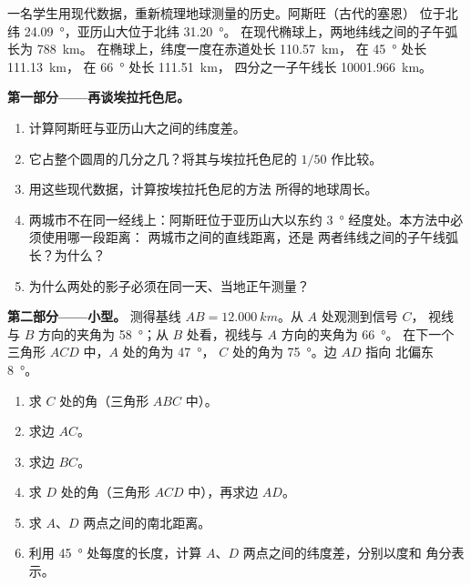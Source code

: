 \begin{problem}
\label{pb:g10:measuring-the-earth:1}
一名学生用现代数据，重新梳理地球测量的历史。阿斯旺（古代的塞恩）
位于北纬 \qty{24.09}{\degree}，亚历山大位于北纬 \qty{31.20}{\degree}。
在现代椭球上，两地纬线之间的子午弧长为 \qty{788}{km}。
在椭球上，纬度一度在赤道处长 \qty{110.57}{km}，
在 \qty{45}{\degree} 处长 \qty{111.13}{km}，
在 \qty{66}{\degree} 处长 \qty{111.51}{km}，
四分之一子午线长
\qty{10001.966}{km}。

\medskip
\noindent\textbf{第一部分——再谈埃拉托色尼。}
\begin{enumerate}
  \item 计算阿斯旺与亚历山大之间的纬度差。
  \item 它占整个圆周的几分之几？将其与埃拉托色尼的
        $1/50$ 作比较。
  \item 用这些现代数据，计算按埃拉托色尼的方法
        所得的地球周长。
  \item 两城市不在同一经线上：阿斯旺位于亚历山大以东约
        \qty{3}{\degree} 经度处。本方法中必须使用哪一段距离：
        两城市之间的直线距离，还是
        两者纬线之间的子午线弧长？为什么？
  \item 为什么两处的影子必须在同一天、当地正午测量？
\end{enumerate}

\medskip
\noindent\textbf{第二部分——小型。}
测得基线 $AB = \qty{12.000}{km}$。从 $A$ 处观测到信号 $C$，
视线与 $B$ 方向的夹角为 \qty{58}{\degree}；从 $B$ 处看，视线与 $A$ 方向的夹角为 \qty{66}{\degree}。
在下一个三角形 $ACD$ 中，$A$ 处的角为 \qty{47}{\degree}，
$C$ 处的角为 \qty{75}{\degree}。边 $AD$ 指向
北偏东 \qty{8}{\degree}。
\begin{enumerate}[resume]
  \item 求 $C$ 处的角（三角形 $ABC$ 中）。
  \item 求边 $AC$。
  \item 求边 $BC$。
  \item 求 $D$ 处的角（三角形 $ACD$ 中），再求边 $AD$。
  \item 求 $A$、$D$ 两点之间的南北距离。
  \item 利用 \qty{45}{\degree} 处每度的长度，计算
        $A$、$D$ 两点之间的纬度差，分别以度和
        角分表示。
\end{enumerate}


\end{problem}
